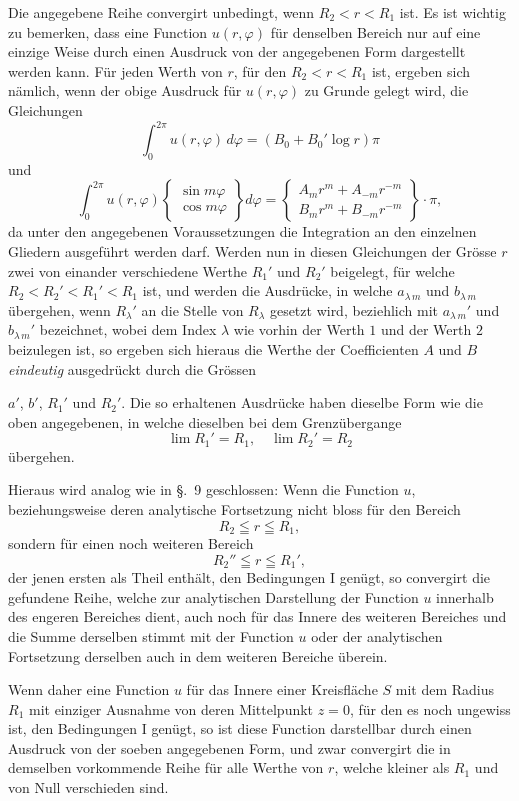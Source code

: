 \documentclass{article}
\begin{document}
Die angegebene Reihe convergirt unbedingt, wenn $R_2 < r < R_1$ ist. Es ist wichtig zu bemerken, dass eine Function $u(r, \varphi)$ für denselben Bereich nur auf eine einzige Weise durch einen Ausdruck von der angegebenen Form dargestellt werden kann. Für jeden Werth von $r$, für den $R_2 < r < R_1$ ist, ergeben sich nämlich, wenn der obige Ausdruck für $u(r, \varphi)$ zu Grunde gelegt wird, die Gleichungen
\[
\int_0^{2\pi} u(r, \varphi) \, d\varphi = (B_0 + B_0' \log r) \pi
\]
und
\[
\int_0^{2\pi} u(r, \varphi) \left\{ \begin{array}{c} \sin m\varphi \\ \cos m\varphi \end{array} \right\} d\varphi = \left\{ \begin{array}{c} A_m r^m + A_{-m} r^{-m} \\ B_m r^m + B_{-m} r^{-m} \end{array} \right\} \cdot \pi,
\]
da unter den angegebenen Voraussetzungen die Integration an den einzelnen Gliedern ausgeführt werden darf. Werden nun in diesen Gleichungen der Grösse $r$ zwei von einander verschiedene Werthe $R_1'$ und $R_2'$ beigelegt, für welche $R_2 < R_2' < R_1' < R_1$ ist, und werden die Ausdrücke, in welche $a_{\lambda\,m}$ und $b_{\lambda\,m}$ übergehen, wenn $R_\lambda'$ an die Stelle von $R_\lambda$ gesetzt wird, beziehlich mit $a_{\lambda\,m}'$ und $b_{\lambda\,m}'$ bezeichnet, wobei dem Index $\lambda$ wie vorhin der Werth $1$ und der Werth $2$ beizulegen ist, so ergeben sich hieraus die Werthe der Coefficienten $A$ und $B$ \emph{eindeutig} ausgedrückt durch die Grössen

$a'$, $b'$, $R_1'$ und $R_2'$. Die so erhaltenen Ausdrücke haben dieselbe Form wie die oben angegebenen, in welche dieselben bei dem Grenzübergange
\[
\lim R_1' = R_1, \quad \lim R_2' = R_2
\]
übergehen.

Hieraus wird analog wie in §.~9 geschlossen: Wenn die Function $u$, beziehungsweise deren analytische Fortsetzung nicht bloss für den Bereich
\[
R_2 \leqq r \leqq R_1,
\]
sondern für einen noch weiteren Bereich
\[
R_2'' \leqq r \leqq R_1',
\]
der jenen ersten als Theil enthält, den Bedingungen I genügt, so convergirt die gefundene Reihe, welche zur analytischen Darstellung der Function $u$ innerhalb des engeren Bereiches dient, auch noch für das Innere des weiteren Bereiches und die Summe derselben stimmt mit der Function $u$ oder der analytischen Fortsetzung derselben auch in dem weiteren Bereiche überein.

Wenn daher eine Function $u$ für das Innere einer Kreisfläche $S$ mit dem Radius $R_1$ mit einziger Ausnahme von deren Mittelpunkt $z = 0$, für den es noch ungewiss ist, den Bedingungen I genügt, so ist diese Function darstellbar durch einen Ausdruck von der soeben angegebenen Form, und zwar convergirt die in demselben vorkommende Reihe für alle Werthe von $r$, welche kleiner als $R_1$ und von Null verschieden sind.
\end{document}
